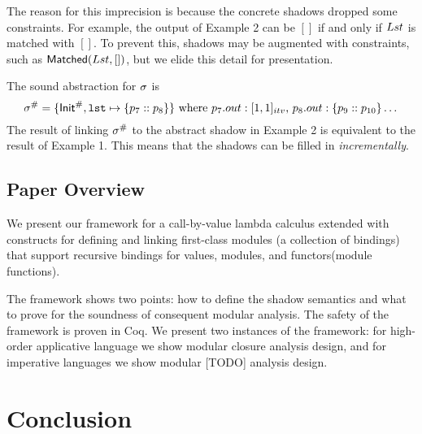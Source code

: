 \documentclass{article}
\begin{document}
The reason for this imprecision is because the concrete shadows dropped some constraints.
For example, the output of Example 2 can be $[]$ if and only if
${Lst}$ is matched with $[]$. To prevent this, shadows may be augmented with
constraints, such as $\textsf{Matched}({Lst},[])$, but we elide this detail
for presentation.

The sound abstraction for $\sigma$ is
\[
  {\sigma}^{\#}=\{{\mathsf{Init}}^{\#},\texttt{lst}\mapsto\{p_7::p_8\}\}
  \text{ where }
  p_7.{out}:[1,1]_{{itv}}
  \text{, }
  p_8.{out}:\{p_9::p_{10}\}\dots
\]
The result of linking ${\sigma}^{\#}$ to the abstract shadow in Example 2
is equivalent to the result of Example 1. This means that the
shadows can be filled in \emph{incrementally}.

\subsection{Paper Overview}
We present our framework for a call-by-value lambda calculus extended
with constructs for defining and linking first-class modules (a
collection of bindings) that support recursive bindings for values,
modules, and functors(module functions).

The framework shows two points: how to define the shadow semantics and
what to prove for the soundness of consequent modular analysis. The
safety of the framework is proven in Coq. We present two instances of the
framework: for high-order applicative language we show modular
closure analysis design, and for imperative languages we show modular
  [TODO] analysis design.

\clearpage

\clearpage

\clearpage


\section{Conclusion}
\end{document}
